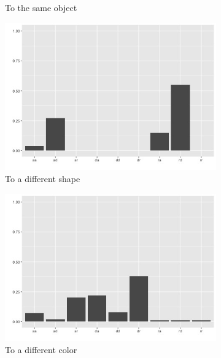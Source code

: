 \documentclass{article}
\begin{document}
\begin{figure}
\begin{subfigure}[t]{0.25\textwidth}
    \caption{To the same object} \label{fig:agg_g6}
  \end{subfigure}

  \vspace{1em}
  \begin{subfigure}[t]{0.25\textwidth}
    \centering
    \includegraphics[width=\linewidth]{agg_g2} 
    \caption{To a different shape} \label{fig:agg_g2}
  \end{subfigure}
  \begin{subfigure}[t]{0.25\textwidth}
    \centering
    \includegraphics[width=\linewidth]{agg_g4} 
    \caption{To a different color} \label{fig:agg_g4}
  \end{subfigure}
  \begin{subfigure}[t]{0.25\textwidth}
    \centering

\end{subfigure}
\end{figure}
\end{document}
